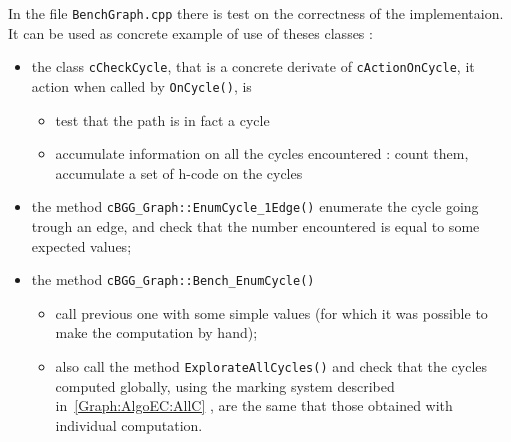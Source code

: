 In the file {\tt BenchGraph.cpp} there is test on the correctness of the implementaion. It can be used
 as concrete  example of use of theses classes :

\begin{itemize}
   \item the class {\tt cCheckCycle}, that is a concrete derivate of  {\tt cActionOnCycle}, it action when called by
          {\tt OnCycle()}, is 
         \begin{itemize}
             \item test that the path is in fact a cycle
             \item accumulate information on all the cycles encountered : count them, accumulate a set of h-code on the cycles
         \end{itemize}

    \item the method  {\tt cBGG\_Graph::EnumCycle\_1Edge()} enumerate the cycle going trough an edge, and check that the number
          encountered is equal to some expected values;

    \item the method  {\tt cBGG\_Graph::Bench\_EnumCycle()} 
         \begin{itemize}
               \item   call previous one with some simple values (for which it was possible
                       to make the computation by hand);  
                \item also call the method {\tt ExplorateAllCycles()} and check that the cycles computed globally, 
                      using the marking system described in~\ref{Graph:AlgoEC:AllC} , are the same that those obtained
                       with individual computation.
         \end{itemize}

\end{itemize}






